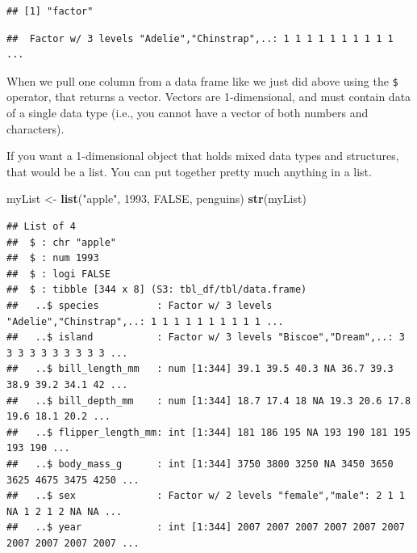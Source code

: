 \documentclass[
]{book}
\newenvironment{Shaded}{\begin{snugshade}}{\end{snugshade}}
\newcommand{\ConstantTok}[1]{\textcolor[rgb]{0.56,0.35,0.01}{#1}}
\newcommand{\DecValTok}[1]{\textcolor[rgb]{0.00,0.00,0.81}{#1}}
\newcommand{\FunctionTok}[1]{\textcolor[rgb]{0.13,0.29,0.53}{\textbf{#1}}}
\newcommand{\NormalTok}[1]{#1}
\newcommand{\OtherTok}[1]{\textcolor[rgb]{0.56,0.35,0.01}{#1}}
\newcommand{\SpecialCharTok}[1]{\textcolor[rgb]{0.81,0.36,0.00}{\textbf{#1}}}
\newcommand{\StringTok}[1]{\textcolor[rgb]{0.31,0.60,0.02}{#1}}
\begin{document}
\begin{verbatim}
## [1] "factor"
\end{verbatim}

\begin{Shaded}
\end{Shaded}

\begin{verbatim}
##  Factor w/ 3 levels "Adelie","Chinstrap",..: 1 1 1 1 1 1 1 1 1 1 ...
\end{verbatim}

When we pull one column from a data frame like we just did above using the \texttt{\$} operator, that returns a vector. Vectors are 1-dimensional, and must contain data of a single data type (i.e., you cannot have a vector of both numbers and characters).

If you want a 1-dimensional object that holds mixed data types and structures, that would be a list. You can put together pretty much anything in a list.

\begin{Shaded}
\begin{Highlighting}[]
\NormalTok{myList }\OtherTok{\textless{}{-}} \FunctionTok{list}\NormalTok{(}\StringTok{"apple"}\NormalTok{, }\DecValTok{1993}\NormalTok{, }\ConstantTok{FALSE}\NormalTok{, penguins)}
\FunctionTok{str}\NormalTok{(myList)}
\end{Highlighting}
\end{Shaded}

\begin{verbatim}
## List of 4
##  $ : chr "apple"
##  $ : num 1993
##  $ : logi FALSE
##  $ : tibble [344 x 8] (S3: tbl_df/tbl/data.frame)
##   ..$ species          : Factor w/ 3 levels "Adelie","Chinstrap",..: 1 1 1 1 1 1 1 1 1 1 ...
##   ..$ island           : Factor w/ 3 levels "Biscoe","Dream",..: 3 3 3 3 3 3 3 3 3 3 ...
##   ..$ bill_length_mm   : num [1:344] 39.1 39.5 40.3 NA 36.7 39.3 38.9 39.2 34.1 42 ...
##   ..$ bill_depth_mm    : num [1:344] 18.7 17.4 18 NA 19.3 20.6 17.8 19.6 18.1 20.2 ...
##   ..$ flipper_length_mm: int [1:344] 181 186 195 NA 193 190 181 195 193 190 ...
##   ..$ body_mass_g      : int [1:344] 3750 3800 3250 NA 3450 3650 3625 4675 3475 4250 ...
##   ..$ sex              : Factor w/ 2 levels "female","male": 2 1 1 NA 1 2 1 2 NA NA ...
##   ..$ year             : int [1:344] 2007 2007 2007 2007 2007 2007 2007 2007 2007 2007 ...
\end{verbatim}
\end{document}
